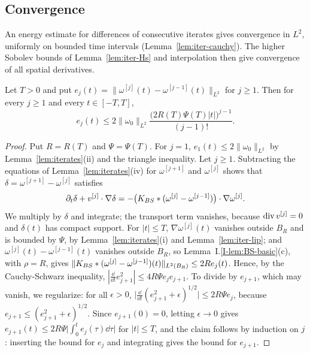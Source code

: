 \subsection{Convergence}

An energy estimate for differences of consecutive iterates gives convergence
in $L^2$, uniformly on bounded time intervals (Lemma~\ref{lem:iter-cauchy}).
The higher Sobolev bounds of Lemma~\ref{lem:iter-Hs} and interpolation then give
convergence of all spatial derivatives.

\begin{lemma}
\label{lem:iter-cauchy}
Let $T>0$ and put $e_j(t)=\|\omega^{[j]}(t)-\omega^{[j-1]}(t)\|_{L^2}$ for $j\ge1$.
Then for every $j\ge1$ and every $t\in[-T,T]$,
\[
e_{j}(t)\le2\|\omega_0\|_{L^2}\frac{\big(2R(T)\Psi(T)|t|\big)^{j-1}}{(j-1)!} .
\]
\end{lemma}

\begin{proof}
Put $R=R(T)$ and $\Psi=\Psi(T)$. For $j=1$, $e_1(t)\le2\|\omega_0\|_{L^2}$ by
Lemma~\ref{lem:iterates}(ii) and the triangle inequality. Let $j\ge1$. Subtracting the equations of
Lemma~\ref{lem:iterates}(iv) for $\omega^{[j+1]}$ and $\omega^{[j]}$ shows that
$\delta=\omega^{[j+1]}-\omega^{[j]}$ satisfies
\[
\partial_t\delta+v^{[j]}\cdot\nabla\delta=-\big(K_{BS}\ast(\omega^{[j]}-\omega^{[j-1]})\big)\cdot\nabla\omega^{[j]} .
\]
We multiply by $\delta$ and integrate; the transport term vanishes, because
$\operatorname{div} v^{[j]}=0$ and $\delta(t)$ has compact support. For $|t|\le T$, $\nabla\omega^{[j]}(t)$ vanishes outside $B_R$ and is
bounded by $\Psi$, by Lemma~\ref{lem:iterates}(i) and Lemma~\ref{lem:iter-lip};
and $\omega^{[j]}(t)-\omega^{[j-1]}(t)$ vanishes outside $B_R$, so
Lemma~I.\ref{I-lem:BS-basic}(c), with $\rho=R$, gives
$\|K_{BS}\ast(\omega^{[j]}-\omega^{[j-1]})(t)\|_{L^2(B_R)}\le2Re_j(t)$. Hence, by the
Cauchy-Schwarz inequality,
$|\frac{\dd}{\dd t}e_{j+1}^2|\le4R\Psi e_je_{j+1}$. To divide by $e_{j+1}$, which
may vanish, we regularize: for all $\epsilon>0$,
$\big|\frac{\dd}{\dd t}(e_{j+1}^2+\epsilon)^{1/2}\big|\le2R\Psi e_j$, because
$e_{j+1}\le(e_{j+1}^2+\epsilon)^{1/2}$. Since
$e_{j+1}(0)=0$, letting $\epsilon\to0$ gives
$e_{j+1}(t)\le2R\Psi\big|\int_0^te_j(\tau)\dd\tau\big|$ for $|t|\le T$, and the
claim follows by induction on $j$: inserting the bound for $e_j$ and integrating
gives the bound for $e_{j+1}$.
\end{proof}

